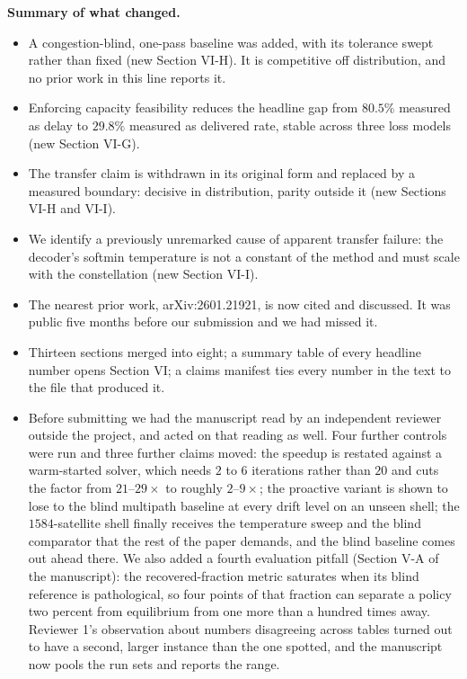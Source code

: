 \documentclass[11pt]{article}
\begin{document}
\textbf{Summary of what changed.}
\begin{itemize}[leftmargin=1.4em,itemsep=2pt]
\item A congestion-blind, one-pass baseline was added, with its tolerance swept rather than fixed
(new Section VI-H). It is competitive off distribution, and no prior work in this line reports it.
\item Enforcing capacity feasibility reduces the headline gap from $80.5\%$ measured as delay to
$29.8\%$ measured as delivered rate, stable across three loss models (new Section VI-G).
\item The transfer claim is withdrawn in its original form and replaced by a measured boundary:
decisive in distribution, parity outside it (new Sections VI-H and VI-I).
\item We identify a previously unremarked cause of apparent transfer failure: the decoder's softmin
temperature is not a constant of the method and must scale with the constellation (new Section
VI-I).
\item The nearest prior work, arXiv:2601.21921, is now cited and discussed. It was public five
months before our submission and we had missed it.
\item Thirteen sections merged into eight; a summary table of every headline number opens Section
VI; a claims manifest ties every number in the text to the file that produced it.
\item Before submitting we had the manuscript read by an independent reviewer outside the
project, and acted on that reading as well. Four further controls were run and three further
claims moved: the speedup is restated against a warm-started solver, which needs $2$ to $6$
iterations rather than $20$ and cuts the factor from $21$--$29\times$ to roughly $2$--$9\times$;
the proactive variant is shown to lose to the blind multipath baseline at every drift level on an
unseen shell; the $1584$-satellite shell finally receives the temperature sweep and the blind
comparator that the rest of the paper demands, and the blind baseline comes out ahead there. We
also added a fourth evaluation pitfall (Section V-A of the manuscript): the
recovered-fraction metric saturates when its blind reference is pathological, so four points of
that fraction can separate a policy two percent from equilibrium from one more than a hundred
times away. Reviewer 1's observation about numbers disagreeing across tables turned out to have a
second, larger instance than the one spotted, and the manuscript now pools the run sets and
reports the range.

\end{itemize}
\end{document}
